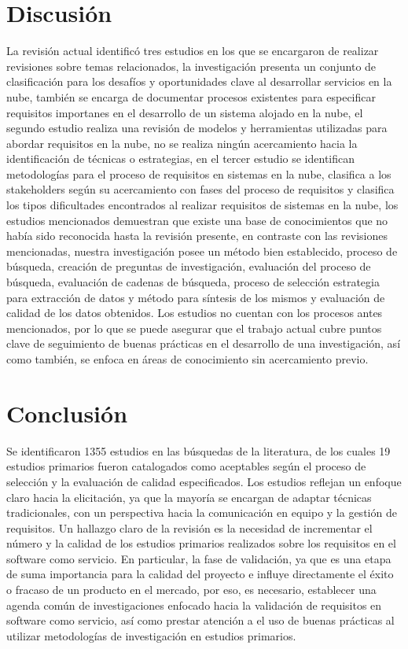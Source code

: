\documentclass[conference,onecolumn,10pt]{IEEEtran}
\begin{document}
\section{Discusión}
La revisión actual identificó tres estudios en los que se encargaron de realizar revisiones sobre temas relacionados, 
la investigación  \cite{existente1} presenta un conjunto de clasificación para los desafíos y oportunidades clave 
al desarrollar servicios en la nube, también se encarga de documentar procesos existentes para especificar requisitos 
importanes en el desarrollo de un sistema alojado en la nube, el segundo estudio \cite{existente2} realiza una revisión 
de modelos y herramientas utilizadas para abordar requisitos en la nube, no se realiza ningún acercamiento hacia 
la identificación de técnicas o estrategias, en el tercer estudio \cite{existente3} se identifican metodologías 
para el proceso de requisitos en sistemas en la nube, clasifica a los stakeholders según su acercamiento con 
fases del proceso de requisitos y clasifica los tipos dificultades encontrados al realizar requisitos de sistemas en la nube, 
los estudios mencionados demuestran que existe una base de conocimientos que no había sido reconocida hasta la revisión presente, 
en contraste con las revisiones mencionadas, nuestra investigación posee un método bien establecido, proceso de búsqueda, 
creación de preguntas de investigación, evaluación del proceso de búsqueda, evaluación de cadenas de búsqueda, proceso de selección
estrategia para extracción de datos y método para síntesis de los mismos y evaluación de calidad de los datos obtenidos. 
Los estudios no cuentan con los procesos antes mencionados, por lo que se puede asegurar que el trabajo actual cubre puntos clave
de seguimiento de buenas prácticas en el desarrollo de una investigación, así como también, se enfoca en áreas de conocimiento sin 
acercamiento previo. 

\section{Conclusión}
Se identificaron 1355 estudios en las búsquedas de la literatura, de los cuales 19 estudios primarios 
fueron catalogados como aceptables según el proceso de selección y la evaluación de calidad especificados. 
Los estudios reflejan un enfoque claro hacia la elicitación, ya que la mayoría se encargan de adaptar 
técnicas tradicionales, con un perspectiva hacia la comunicación en equipo y la gestión de requisitos.
Un hallazgo claro de la revisión es la necesidad de incrementar el número y la calidad de los estudios primarios 
realizados sobre los requisitos en el software como servicio. En particular, la fase de validación, ya que 
es una etapa de suma importancia para la calidad del proyecto e influye directamente el éxito o fracaso de un producto 
en el mercado, por eso, es necesario, establecer una agenda común de investigaciones enfocado hacia la validación de requisitos en software 
como servicio, así como prestar atención a el uso de buenas prácticas al utilizar metodologías de investigación en estudios 
primarios. 
\end{document}
